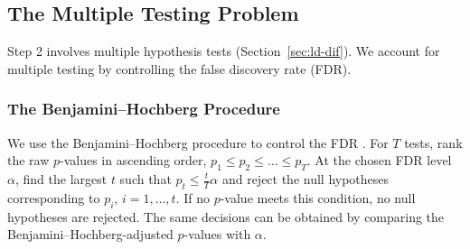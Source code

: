 \subsection{The Multiple Testing Problem}
Step 2 involves multiple hypothesis tests (Section~\ref{sec:ld-dif}). We account for multiple testing by controlling the false discovery rate (FDR).

\subsubsection{The Benjamini--Hochberg Procedure}
%
We use the Benjamini--Hochberg procedure to control the FDR \citep{benjamini-hochberg-1995}. For $T$ tests, rank the raw $p$-values in ascending order, $p_1\leq p_2\leq \dots \leq p_T$. At the chosen FDR level $\alpha$, find the largest $t$ such that $p_t\leq \frac{t}{T}\alpha$ and reject the null hypotheses corresponding to $p_i$, $i=1,\dots,t$. If no $p$-value meets this condition, no null hypotheses are rejected. The same decisions can be obtained by comparing the Benjamini--Hochberg-adjusted $p$-values with $\alpha$.
